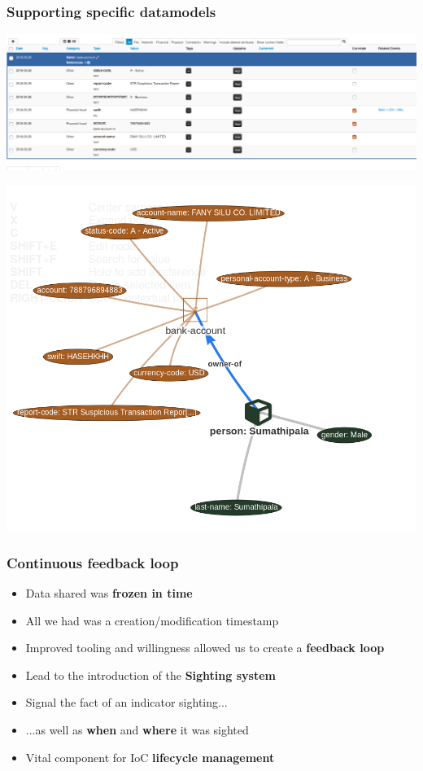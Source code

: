 \begin{frame}
  \frametitle{Supporting specific datamodels}
  \begin{center}
    \includegraphics[scale=0.24]{bankaccount.png}
  \end{center}
  \begin{center}
    \includegraphics[scale=0.18]{bankview.png}
  \end{center}
\end{frame}

\begin{frame}
  \frametitle{Continuous feedback loop}
  \begin{itemize}		  
    \item Data shared was {\bf frozen in time}
    \item All we  had was a creation/modification timestamp
    \item Improved tooling and willingness allowed us to create a {\bf feedback loop}
    \item Lead to the introduction of the {\bf Sighting system}
    \item Signal the fact of an indicator sighting...
    \item ...as well as {\bf when} and {\bf where} it was sighted
    \item Vital component for IoC {\bf lifecycle management}
  \end{itemize}
\end{frame}

